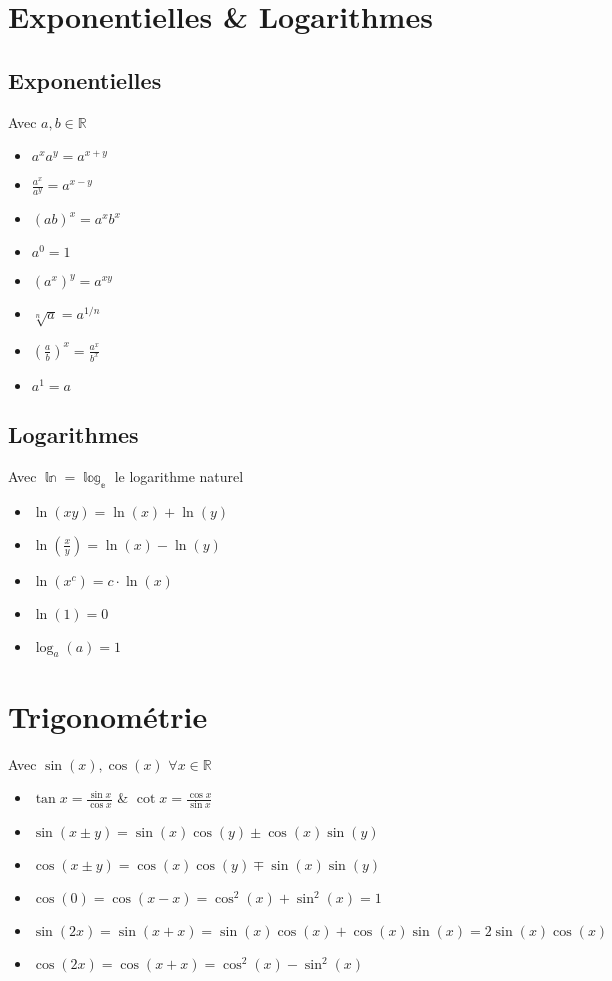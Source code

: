 \documentclass[10pt,a4paper]{book}
\newcommand{\R}{\mathbb{R}}
\begin{document}
\section{Exponentielles \& Logarithmes}

\subsection{Exponentielles}

Avec $a,b \in \R$
\begin{itemize}
\item $a^xa^y = a^{x+y}$
\item $\frac{a^x}{a^y} = a^{x-y}$
\item $(ab)^x = a^xb^x$
\item $a^0 = 1$
\item $(a^x)^y = a^{xy}$
\item $\sqrt[n]{a} = a^{1/n}$
\item $\left(\frac{a}{b}\right)^x = \frac{a^x}{b^x}$
\item $a^1 = a$
\end{itemize}

\subsection{Logarithmes}

Avec $\mathbb{\ln = \log_e}$ le logarithme naturel
\begin{itemize}
\item $\ln(xy) = \ln(x) + \ln(y)$
\item $\ln(\frac{x}{y}) = \ln(x) - \ln(y)$
\item $\ln(x^c) = c\cdot \ln(x)$
\item $\ln(1) = 0$
\item $\log_a(a) = 1$
\end{itemize}

\section{Trigonométrie}

Avec $\sin(x), \cos(x)$  $\forall x \in \R$
\begin{itemize}
\item $\tan x = \frac{\sin x}{\cos x}$ \& $\cot x = \frac{\cos x}{\sin x}$
\item $\sin(x\pm y) = \sin(x)\cos(y) \pm \cos(x)\sin(y)$
\item $\cos(x \pm y) = \cos(x)\cos(y) \mp \sin(x)\sin(y)$
\item $\cos(0) = \cos(x-x) = \cos^2(x) + \sin^2(x) = 1$
\item $\sin(2x) = \sin(x+x) = \sin(x)\cos(x) + \cos(x)\sin(x) = 2\sin(x)\cos(x)$
\item $\cos(2x) = \cos(x+x) = \cos^2(x) - \sin^2(x)$
\end{itemize}
\end{document}
